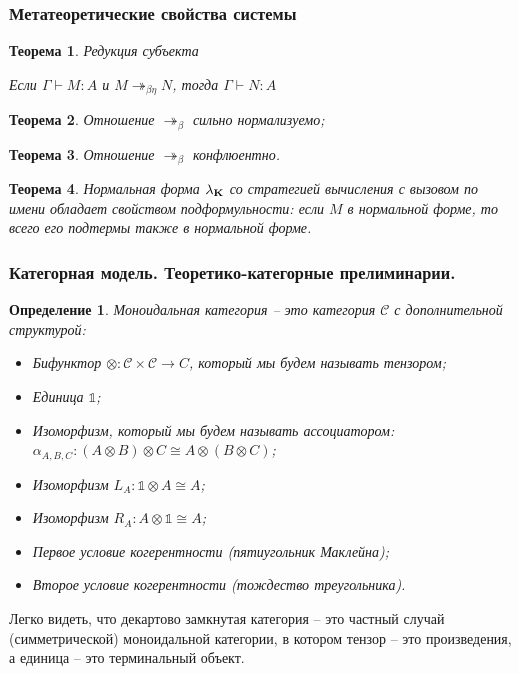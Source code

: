\documentclass[10pt,pdf,utf8,russian,aspectratio=169]{beamer}
\newtheorem{defin}{Определение}
\newtheorem{theor}{Теорема}
\begin{document}
\begin{frame}
  \frametitle{Метатеоретические свойства системы}

  \begin{theor} Редукция субъекта

  Если $\Gamma \vdash M : A$ и $M \twoheadrightarrow_{\beta \eta} N$, тогда $\Gamma \vdash N : A$

  \end{theor}

  \begin{theor}
  Отношение $\twoheadrightarrow_{\beta}$ сильно нормализуемо;
  \end{theor}

  \begin{theor}
  Отношение $\twoheadrightarrow_{\beta}$ конфлюентно.
  \end{theor}

  \begin{theor}
  Нормальная форма $\lambda_{{\bf K}}$ со стратегией вычисления с вызовом по имени обладает свойством подформульности: если $M$ в нормальной форме, то всего его подтермы также в нормальной форме.

  \end{theor}


\end{frame}

\begin{frame}
  \frametitle{Категорная модель. Теоретико-категорные прелиминарии.}

  \begin{defin}

    Моноидальная категория -- это категория $\mathcal{C}$ с дополнительной структурой:
    \begin{itemize}
      \item Бифунктор $\otimes : \mathcal{C} \times \mathcal{C} \to C$, который мы будем называть тензором;
      \item Единица $\mathds{1}$;
      \item Изоморфизм, который мы будем называть ассоциатором: $\alpha_{A,B,C}: (A \otimes B) \otimes C \cong A \otimes (B \otimes C)$;
      \item Изоморфизм  $L_A : \mathds{1} \otimes A \cong A$;
      \item Изоморфизм $R_A : A \otimes \mathds{1} \cong A$;
      \item Первое условие когерентности (пятиугольник Маклейна);
      \item Второе условие когерентности (тождество треугольника).
    \end{itemize}
      \end{defin}

Легко видеть, что декартово замкнутая категория -- это частный случай (симметрической) моноидальной категории, в котором тензор -- это произведения, а единица -- это терминальный объект.


\end{frame}
\end{document}
